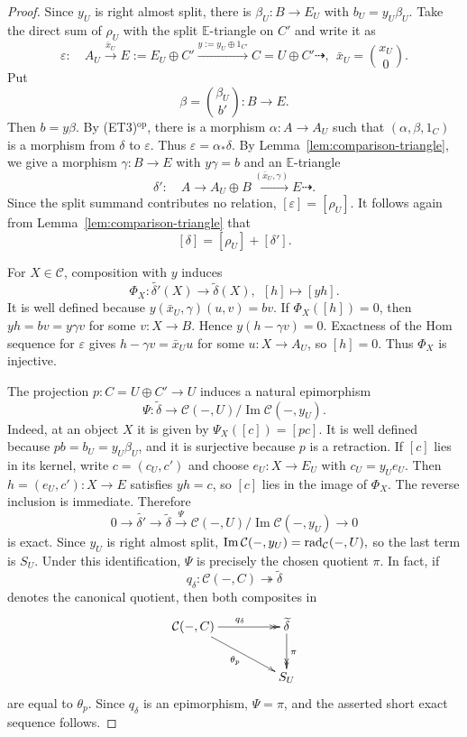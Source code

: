 \documentclass[11pt, twoside]{article}
\def\C{\mathcal{C}}
\def\E{\mathbb{E}}
\numberwithin{equation}{section}
\begin{document}
\begin{proof}
Since $y_U$ is right almost split, there is $\beta_U:B\to E_U$ with
$b_U=y_U\beta_U$.  Take the direct sum of $\rho_U$ with the split
$\E$-triangle on $C'$ and write it as
\[
 \varepsilon:\quad
 A_U\xrightarrow{\bar x_U}E:=E_U\oplus C'
 \xrightarrow{y:=y_U\oplus1_{C'}}C=U\oplus C'\dashrightarrow,
 ~~ \bar x_U=\binom{x_U}{0}.
\]
Put
\[
 \beta=\binom{\beta_U}{b'}:B\longrightarrow E.
\]
Then $b=y\beta$.  By (ET3)$^{\mathrm{op}}$, there is a morphism
$\alpha:A\to A_U$ such that $(\alpha,\beta,1_C)$ is a morphism from
$\delta$ to $\varepsilon$.  Thus $\varepsilon=\alpha_*\delta$. By Lemma~\ref{lem:comparison-triangle},
we give a morphism $\gamma:B\to E$ with $y\gamma=b$ and an $\E$-triangle
\[
 \delta':\quad
 A\longrightarrow A_U\oplus B
 \xrightarrow{(\bar x_U,\gamma)}E\dashrightarrow.
\]
Since the split summand contributes no relation, $[\varepsilon]=[\rho_U]$. It follows again from Lemma~\ref{lem:comparison-triangle} that
\[
 [\delta]=[\rho_U]+[\delta'].
\]

For $X\in\C$, composition with $y$ induces
\[
 \Phi_X:\widetilde{\delta'}(X)\longrightarrow\widetilde\delta(X),
 ~~ [h]\longmapsto[yh].
\]
It is well defined because
$y(\bar x_U,\gamma)(u,v)=bv$.  If $\Phi_X([h])=0$, then
$yh=bv=y\gamma v$ for some $v:X\to B$.  Hence
$y(h-\gamma v)=0$.  Exactness of the Hom sequence for $\varepsilon$ gives
$h-\gamma v=\bar x_Uu$ for some $u:X\to A_U$, so $[h]=0$.  Thus
$\Phi_X$ is injective.

The projection $p:C=U\oplus C'\to U$ induces a natural epimorphism
\[
 \Psi:\widetilde\delta\longrightarrow
 \C(-,U)/\operatorname{Im}\C(-,y_U).
\]
Indeed, at an object $X$ it is given by
$
 \Psi_X([c])=[pc].
$
It is well defined because $pb=b_U=y_U\beta_U$, and it is surjective
because $p$ is a retraction.  If $[c]$ lies in its kernel, write
$c=(c_U,c')$ and choose $e_U:X\to E_U$ with $c_U=y_Ue_U$.  Then
$h=(e_U,c'):X\to E$ satisfies $yh=c$, so $[c]$ lies in the image of
$\Phi_X$.  The reverse inclusion is immediate.  Therefore
\[
 0\longrightarrow\widetilde{\delta'}
 \longrightarrow\widetilde\delta
 \xrightarrow{\Psi}
 \C(-,U)/\operatorname{Im}\C(-,y_U)\longrightarrow0
\]
is exact.  Since $y_U$ is right almost split,
$
 \operatorname{Im}\C(-,y_U)=\rad_\C(-,U),
$
so the last term is $S_U$.  Under this identification, $\Psi$ is precisely
the chosen quotient $\pi$.  In fact, if
$$q_\delta:\C(-,C)\twoheadrightarrow\widetilde\delta$$
denotes the
canonical quotient, then both composites in
\[
\xymatrix@C=4.5em{
 \C(-,C) \ar@{->>}[r]^{q_\delta} \ar[dr]_{\theta_p} &
 \widetilde\delta \ar@{->>}[d]^{\pi} \\
 & S_U
}
\]
are equal to $\theta_p$.  Since $q_\delta$ is an epimorphism,
$\Psi=\pi$, and the asserted short exact sequence follows.
\end{proof}
\end{document}
